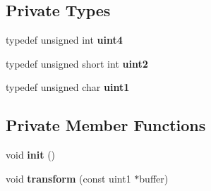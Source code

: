 \subsection*{Private Types}
\begin{DoxyCompactItemize}
\item 
typedef unsigned int {\bfseries uint4}\label{classMD5_a2e5b84a3d7db292f49873061214a0444}

\item 
typedef unsigned short int {\bfseries uint2}\label{classMD5_a938d18555b32c101d427b3158c6c6870}

\item 
typedef unsigned char {\bfseries uint1}\label{classMD5_a3b1c4901139aef256ee49c4ab14d09f9}

\end{DoxyCompactItemize}
\subsection*{Private Member Functions}
\begin{DoxyCompactItemize}
\item 
void {\bfseries init} ()\label{classMD5_a65ddaecdd0bd0b09043a2f3b2601bc2e}

\item 
void {\bfseries transform} (const uint1 $\ast$buffer)\label{classMD5_a93b68e1da5b9b98abcbe386452810959}

\end{DoxyCompactItemize}
